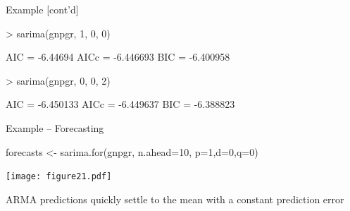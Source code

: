 \documentclass[ignorenonframetext,xcolor=x11names]{beamer}
\begin{document}
\begin{frame}[fragile]{Example \small [cont'd]}
\begin{textcode}
> sarima(gnpgr, 1, 0, 0)

AIC = -6.44694  AICc = -6.446693  BIC = -6.400958 
\end{textcode}

\begin{textcode}
> sarima(gnpgr, 0, 0, 2)

AIC = -6.450133  AICc = -6.449637  BIC = -6.388823 
\end{textcode}
\end{frame}


\begin{frame}[fragile]{Example -- Forecasting}
\begin{Rcode}
forecasts <- sarima.for(gnpgr, n.ahead=10, p=1,d=0,q=0)
\end{Rcode}
\begin{center}
\texttt{[image: figure21.pdf]}
\end{center}
\vspace{-\baselineskip}
\begin{block}{}
\centering \small
ARMA predictions quickly settle to the mean with a constant prediction error
\end{block}
\end{frame}





\end{document}
